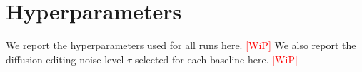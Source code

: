 \section{Hyperparameters}
\label{app:hyperparams}
We report the hyperparameters used for all runs here. \textcolor{red}{[WiP]}
We also report the diffusion-editing noise level $\tau$ selected for each baseline here. \textcolor{red}{[WiP]}
